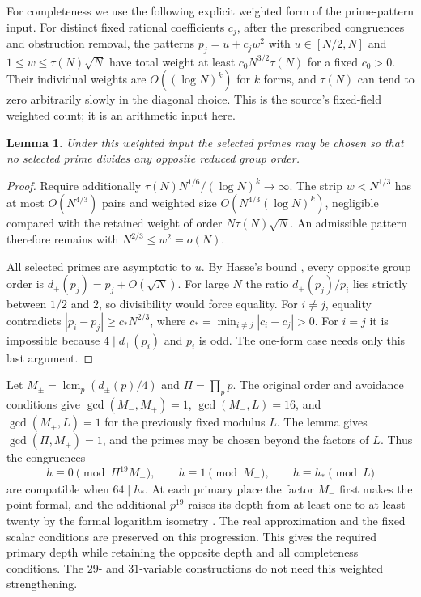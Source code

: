 \documentclass[11pt,a4paper]{article}
\newtheorem{lemma}[theorem]{Lemma}
\theoremstyle{definition}
\theoremstyle{remark}
\begin{document}
For completeness we use the following explicit weighted form of
the prime-pattern input. For distinct fixed rational coefficients
$c_j$, after the prescribed congruences and obstruction removal,
the patterns $p_j=u+c_jw^2$ with $u\in[N/2,N]$ and
$1\le w\le \tau(N)\sqrt N$ have total weight at least $c_0N^{3/2}\tau(N)$ for a fixed
$c_0>0$. Their individual weights are
$O((\log N)^k)$ for $k$ forms, and $\tau(N)$ can tend to zero
arbitrarily slowly in the diagonal choice. This is the source's
fixed-field weighted count; it is an arithmetic input here.

\begin{lemma}\label{lem:prime-order-separation}
Under this weighted input the selected primes may be chosen so
that no selected prime divides any opposite reduced group order.
\end{lemma}
\begin{proof}
Require additionally
$\tau(N)N^{1/6}/(\log N)^k\longrightarrow\infty$.
The strip $w<N^{1/3}$ has at most $O(N^{4/3})$ pairs and
weighted size $O(N^{4/3}(\log N)^k)$, negligible compared with
the retained weight of order $N\tau(N)\sqrt N$.
An admissible pattern therefore remains with
$N^{2/3}\le w^2=o(N)$.

All selected primes are asymptotic to $u$. By Hasse's bound
\cite[Theorem V.1.1]{Silverman2009}, every opposite group order
is $d_+(p_j)=p_j+O(\sqrt N)$. For large $N$ the ratio
$d_+(p_j)/p_i$ lies strictly between $1/2$ and $2$, so divisibility
would force equality. For $i\ne j$, equality contradicts
$|p_i-p_j|\ge c_*N^{2/3}$, where
$c_* =\min_{i\ne j}|c_i-c_j|>0$.
For $i=j$ it is impossible because $4\mid d_+(p_i)$ and
$p_i$ is odd. The one-form case needs only this last argument.
\end{proof}

Let $M_\pm=\operatorname{lcm}_p(d_\pm(p)/4)$ and
$\Pi=\prod_p p$. The original order and avoidance conditions give
$\gcd(M_-,M_+)=1$, $\gcd(M_-,L)=16$, and
$\gcd(M_+,L)=1$ for the previously fixed modulus $L$.
The lemma gives $\gcd(\Pi,M_+)=1$, and the primes may be
chosen beyond the factors of $L$. Thus the congruences
\[
 h\equiv0\pmod{\Pi^{19}M_-},\qquad
 h\equiv1\pmod{M_+},\qquad h\equiv h_*\pmod L
\]
are compatible when $64\mid h_*$. At each primary place the
factor $M_-$ first makes the point formal, and the additional
$p^{19}$ raises its depth from at least one to at least twenty
by the formal logarithm isometry
\cite[Theorem IV.6.4]{Silverman2009}.
The real approximation and the fixed scalar conditions are
preserved on this progression. This gives the required primary
depth while retaining the opposite depth and all completeness
conditions. The $29$- and $31$-variable constructions do not
need this weighted strengthening.
\end{document}
